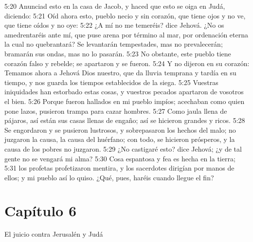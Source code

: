 5:20 Anunciad esto en la casa de Jacob, y haced que esto se oiga en Judá, diciendo: 
5:21 Oíd ahora esto, pueblo necio y sin corazón, que tiene ojos y no ve, que tiene oídos y no oye: 
5:22 ¿A mí no me temeréis? dice Jehová. ¿No os amedrentaréis ante mí, que puse arena por término al mar, por ordenación eterna la cual no quebrantará? Se levantarán tempestades, mas no prevalecerán; bramarán sus ondas, mas no lo pasarán. 
5:23 No obstante, este pueblo tiene corazón falso y rebelde; se apartaron y se fueron. 
5:24 Y no dijeron en su corazón: Temamos ahora a Jehová Dios nuestro, que da lluvia temprana y tardía en su tiempo, y nos guarda los tiempos establecidos de la siega. 
5:25 Vuestras iniquidades han estorbado estas cosas, y vuestros pecados apartaron de vosotros el bien. 
5:26 Porque fueron hallados en mi pueblo impíos; acechaban como quien pone lazos, pusieron trampa para cazar hombres. 
5:27 Como jaula llena de pájaros, así están sus casas llenas de engaño; así se hicieron grandes y ricos. 
5:28 Se engordaron y se pusieron lustrosos, y sobrepasaron los hechos del malo; no juzgaron la causa, la causa del huérfano; con todo, se hicieron prósperos, y la causa de los pobres no juzgaron. 
5:29 ¿No castigaré esto? dice Jehová; ¿y de tal gente no se vengará mi alma? 
5:30 Cosa espantosa y fea es hecha en la tierra; 
5:31 los profetas profetizaron mentira, y los sacerdotes dirigían por manos de ellos; y mi pueblo así lo quiso. ¿Qué, pues, haréis cuando llegue el fin? 
\section*{Capítulo 6 }
El juicio contra Jerusalén y Judá 
 
